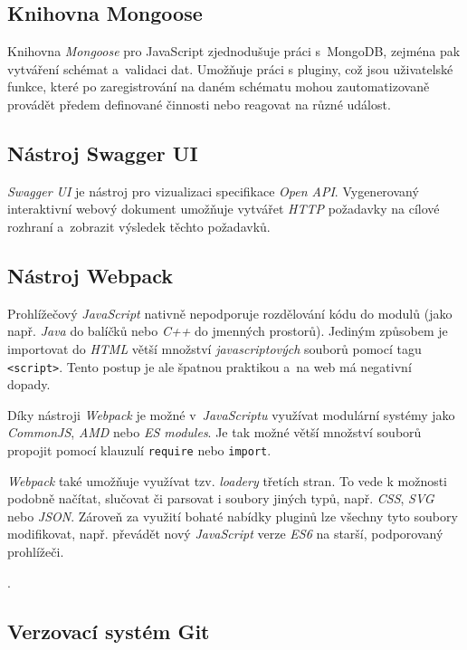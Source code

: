 \documentclass[a4paper,12pt]{article}
\def\code#1{\texttt{#1}}
\begin{document}
\subsection{Knihovna Mongoose}
Knihovna \textit{Mongoose} pro JavaScript zjednodušuje práci s~MongoDB, zejména pak vytváření schémat a~validaci dat. Umožňuje práci s pluginy, což jsou uživatelské funkce, které po zaregistrování na daném schématu mohou zautomatizovaně provádět předem definované činnosti nebo reagovat na různé událost.~\cite{mongomongoose}

\subsection{Nástroj Swagger UI}
\textit{Swagger UI} je nástroj pro vizualizaci specifikace \textit{Open API}. Vygenerovaný interaktivní webový dokument umožňuje vytvářet \textit{HTTP} požadavky na cílové rozhraní a~zobrazit výsledek těchto požadavků.~\cite{swaggerui}

\subsection{Nástroj Webpack}
Prohlížečový \textit{JavaScript} nativně nepodporuje rozdělování kódu do modulů (jako např. \textit{Java} do balíčků nebo \textit{C++} do jmenných prostorů). Jediným způsobem je importovat do \textit{HTML} větší množství \textit{javascriptových} souborů pomocí tagu \code{<script>}. Tento postup je ale špatnou praktikou a~na web má negativní dopady.~\cite{jsconcat}

Díky nástroji \textit{Webpack} je možné v~\textit{JavaScriptu} využívat modulární systémy jako \textit{CommonJS}, \textit{AMD} nebo \textit{ES modules}. Je tak možné větší množství souborů propojit pomocí klauzulí \code{require} nebo \code{import}.~\cite{webpack}

\textit{Webpack} také umožňuje využívat tzv. \textit{loadery} třetích stran. To vede k možnosti podobně načítat, slučovat či parsovat i soubory jiných typů, např. \textit{CSS}, \textit{SVG} nebo \textit{JSON}. Zároveň za využití bohaté nabídky pluginů lze všechny tyto soubory modifikovat, např. převádět nový \textit{JavaScript} verze \textit{ES6} na starší, podporovaný prohlížeči.~\cite{webpack}

.

\subsection{Verzovací systém Git}
\end{document}
